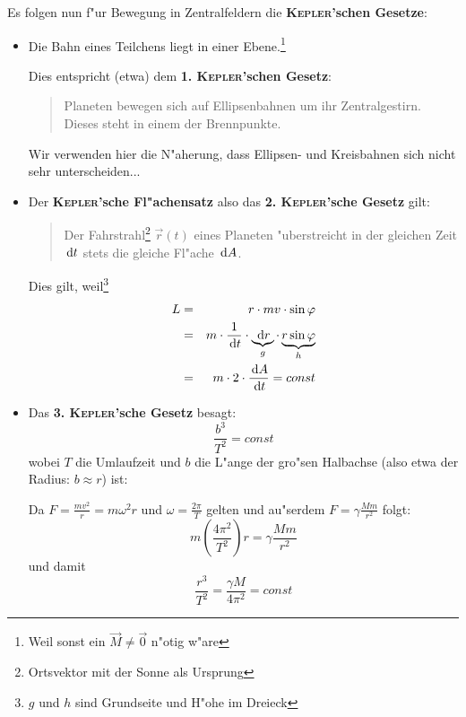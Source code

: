 \begin{Beispiel}
Es folgen nun f"ur Bewegung in Zentralfeldern die
\textbf{\textsc{Kepler}'schen Gesetze}:
\begin{itemize}
\item Die Bahn eines Teilchens liegt in einer Ebene.\footnote{Weil
     sonst ein $\vec M \neq \vec 0$ n"otig w"are}

Dies entspricht (etwa) dem \textbf{1. \textsc{Kepler}'schen Gesetz}:
\begin{quote}
   Planeten bewegen sich auf Ellipsenbahnen um ihr
   Zentralgestirn. Dieses steht in einem der Brennpunkte.
\end{quote}
Wir verwenden hier die N"aherung, dass Ellipsen- und Kreisbahnen sich
nicht sehr unterscheiden...
\item Der \textbf{\textsc{Kepler}'sche Fl"achensatz} also das
   \textbf{2. \textsc{Kepler}'sche Gesetz} gilt: 
   \begin{quote}
      Der Fahrstrahl\footnote{Ortsvektor mit der Sonne als Ursprung}
      $\vec r(t)$
      eines Planeten "uberstreicht in der gleichen Zeit $\, \mathrm{d} t$ stets
      die gleiche Fl"ache $\, \mathrm{d} A$.
   \end{quote}
Dies gilt, weil\footnote{$g$ und $h$ sind Grundseite und H"ohe im Dreieck} 
\begin{eqnarray*}
   \label{eq:32}
L &=& r \cdot mv \cdot \sin \varphi \\
&=& m \cdot \frac{1}{\, \mathrm{d} t} \cdot \underbrace{\, \mathrm{d} r}_g \cdot \underbrace{r
\sin
  \varphi}_h\\
&=& m \cdot 2 \cdot \frac{\, \mathrm{d} A}{\, \mathrm{d} t} = const
\end{eqnarray*}

\item Das \textbf{3. \textsc{Kepler}'sche Gesetz} besagt:
   \begin{equation}
      \label{eq:31}
      \frac{b^3}{T^2} = const
   \end{equation}
   wobei $T$ die Umlaufzeit und $b$ die L"ange der gro"sen Halbachse
   (also etwa der Radius: $b \approx r$) ist:

Da $F = \frac{mv^2}{r} = m\omega^2 r$ und $\omega = \frac{2\pi}{T}$
gelten und au"serdem $F = \gamma \frac{Mm}{r^2}$ folgt:
$$
m \left ( \frac{4\pi^2}{T^2} \right ) r = \gamma \frac{Mm}{r^2}
$$
und damit
$$
\frac{r^3}{T^2} = \frac{\gamma M}{4 \pi^2} = const
$$
\end{itemize}
\end{Beispiel}









